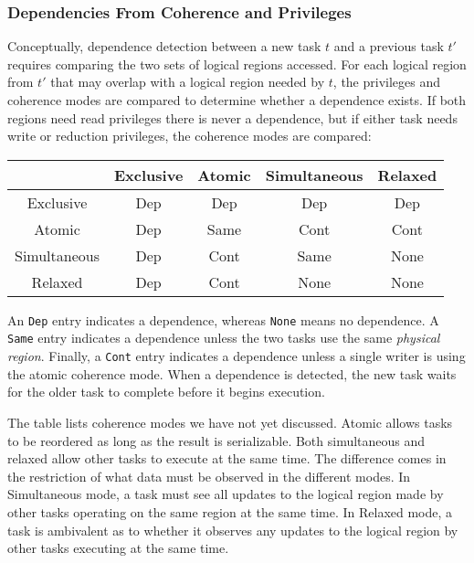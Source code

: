 \subsubsection{Dependencies From Coherence and Privileges}
\label{subsec:cohdep}
Conceptually, dependence detection between a new task $t$ and a previous task $t'$ requires comparing the two sets of
logical regions accessed.  For each logical region from $t'$
that may overlap with a logical region needed by $t$, the privileges
and coherence modes are compared to determine whether a dependence exists.  If
both regions need read
privileges there is never a dependence, but if either 
task needs write or reduction privileges, the coherence modes are compared:

\vspace{2mm}
{\small
\begin{tabular}{c|cccc}
             & Exclusive & Atomic   & Simultaneous & Relaxed \\
\midrule
Exclusive    & Dep & Dep & Dep & Dep \\ 
Atomic       & Dep & Same & Cont & Cont \\
Simultaneous & Dep & Cont & Same & None \\
Relaxed      & Dep & Cont & None & None \\
\end{tabular}
}
\vspace{2mm}

An {\tt Dep} entry indicates a dependence, whereas {\tt None}
means no dependence.  A
{\tt Same} entry indicates a dependence unless the two tasks 
use the same {\em physical region}.  Finally, a {\tt Cont} entry
indicates a dependence unless a single writer is using the
atomic coherence mode.  When a dependence is detected, the new task 
waits for the older task to complete before it begins execution.

The table lists coherence modes we have not yet discussed.  Atomic
allows tasks to be reordered as long as the result is
serializable.  Both simultaneous and relaxed allow other tasks to
execute at the same time.  The difference comes in the restriction of
what data must be observed in the different modes.  In Simultaneous
mode, a task must see all updates to the logical region made by other
tasks operating on the same region at the same time.  In Relaxed mode,
a task is ambivalent as to whether it observes any updates to the
logical region by other tasks executing at the same time.


